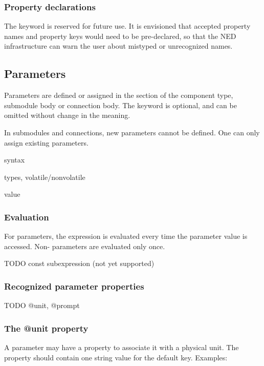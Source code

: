 \subsubsection{Property declarations}

The  keyword is reserved for future use. It is
envisioned that accepted property names and property keys would need
to be pre-declared, so that the NED infrastructure can warn the user
about mistyped or unrecognized names.


\subsection{Parameters}
\label{ch-ned-ref:sec:parameters}

Parameters are defined or assigned in the  section
of the component type, submodule body or connection body.
The  keyword is optional, and can be omitted
without change in the meaning.

In submodules and connections, new parameters cannot be defined. One can
only assign existing parameters.

syntax

types, volatile/nonvolatile

value

\subsubsection{Evaluation}

For  parameters, the expression is evaluated every time the
parameter value is accessed. Non- parameters are evaluated only once.

TODO const subexpression (not yet supported)

\subsubsection{Recognized parameter properties}

TODO @unit, @prompt

\subsubsection{The @unit property}

A parameter may have a  property to associate it with a physical
unit. The  property should contain one string value for the default
key. Examples:

